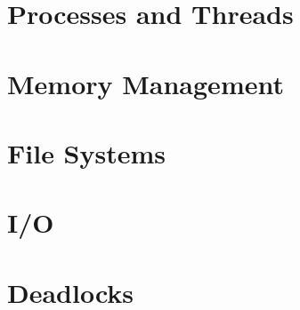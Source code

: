 \documentclass{article}
\begin{document}
\section{Processes and Threads}

\section{Memory Management}

\section{File Systems}

\section{I/O}

\section{Deadlocks}
\end{document}
